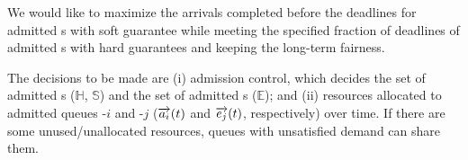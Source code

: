 We would like to maximize the arrivals completed before the deadlines for admitted {\burstq}s with soft guarantee while meeting the specified fraction of deadlines of admitted {\burstq}s with hard guarantees and keeping the long-term fairness.

The decisions to be made are (i) admission control, which decides the set of admitted {\burstq}s ($\mathbb{H}$, $\mathbb{S}$) and the set of admitted {\batchq}s ($\mathbb{E}$); and (ii) resources allocated to admitted queues {\burstq}-$i$ and {\batchq}-$j$ ($\protect\overrightarrow{a_i}(t)$ and $\protect\overrightarrow{e_j}(t)$, respectively) over time. 
If there are some unused/unallocated resources, queues with unsatisfied demand can share them.%

%




